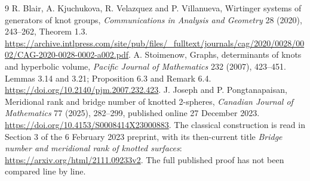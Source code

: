 \documentclass[11pt]{article}
\begin{document}
\begin{thebibliography}{9}
 R. Blair, A. Kjuchukova, R. Velazquez and P. Villanueva,
Wirtinger systems of generators of knot groups,
\emph{Communications in Analysis and Geometry} 28 (2020), 243--262,
Theorem 1.3.
\url{https://archive.intlpress.com/site/pub/files/_fulltext/journals/cag/2020/0028/0002/CAG-2020-0028-0002-a002.pdf}.
 A. Stoimenow, Graphs, determinants of knots and
hyperbolic volume, \emph{Pacific Journal of Mathematics} 232 (2007),
423--451. Lemmas 3.14 and 3.21; Proposition 6.3 and Remark 6.4.
\url{https://doi.org/10.2140/pjm.2007.232.423}.
 J. Joseph and P. Pongtanapaisan,
Meridional rank and bridge number of knotted 2-spheres,
\emph{Canadian Journal of Mathematics} 77 (2025), 282--299,
published online 27 December 2023.
\url{https://doi.org/10.4153/S0008414X23000883}.
The classical construction is read in Section 3 of the
6 February 2023 preprint, with its then-current title
\emph{Bridge number and meridional rank of knotted surfaces}:
\url{https://arxiv.org/html/2111.09233v2}.
The full published proof has not been compared line by line.
\end{thebibliography}
\end{document}
